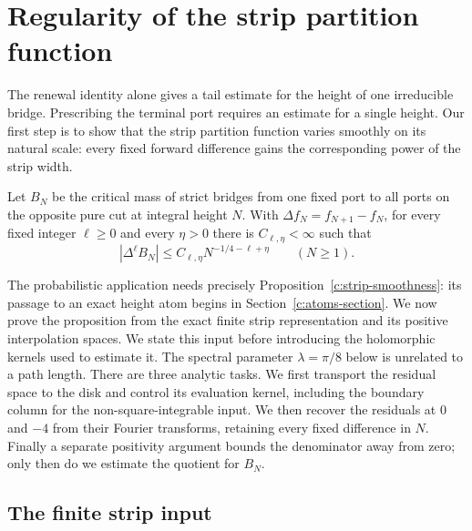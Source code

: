 \section{Regularity of the strip partition function}\label{c:smoothness-section}

The renewal identity alone gives a tail estimate for the height of one
irreducible bridge.  Prescribing the terminal port requires an estimate
for a single height.  Our first step is to show that the strip partition
function varies smoothly on its natural scale: every fixed forward
difference gains the corresponding power of the strip width.

\begin{proposition}\label{c:strip-smoothness}
Let $B_N$ be the critical mass of strict bridges from one fixed port to
all ports on the opposite pure cut at integral height $N$.  With
$\Delta f_N=f_{N+1}-f_N$, for every fixed integer $\ell\ge0$ and every
$\eta>0$ there is $C_{\ell,\eta}<\infty$ such that
\[
 |\Delta^\ell B_N|\le C_{\ell,\eta}N^{-1/4-\ell+\eta}
 \qquad(N\ge1).
\]
\end{proposition}

The probabilistic application needs precisely Proposition~\ref{c:strip-smoothness}:
its passage to an exact height atom begins in Section~\ref{c:atoms-section}.
We now prove the proposition from the exact finite strip representation and its positive
interpolation spaces.  We state this input before introducing the
holomorphic kernels used to estimate it.  The spectral parameter
$\lambda=\pi/8$ below is unrelated to a path length.
There are three analytic tasks.  We first transport the residual space
to the disk and control its evaluation kernel, including the boundary
column for the non-square-integrable input.  We then recover the residuals at $0$ and $-4$
from their Fourier transforms, retaining every fixed difference in $N$.
Finally a separate positivity argument bounds the denominator away from
zero; only then do we estimate the quotient for $B_N$.

\subsection{The finite strip input}

